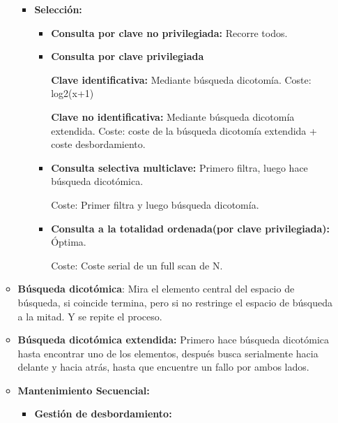 \documentclass[12pt, twoside, openright]{report} %
\begin{document}
\begin{itemize}
\begin{itemize}
\begin{itemize}
      \item \textbf{Selección:}
        

        \begin{itemize}
        \item \textbf{Consulta por clave no privilegiada:} Recorre todos.
          
        \item \textbf{Consulta por clave privilegiada}
          

          
            \textbf{Clave identificativa:} Mediante búsqueda dicotomía. Coste: log2(x+1)
              
			  
         
			
            \textbf{Clave no identificativa:} Mediante búsqueda
            dicotomía extendida. Coste: coste de la búsqueda dicotomía extendida + coste
              desbordamiento.
             
        \item \textbf{Consulta selectiva multiclave:} Primero filtra, luego
          hace búsqueda dicotómica.
          

          
		  
            Coste: Primer filtra y luego búsqueda dicotomía.
            
			
        \item \textbf{Consulta a la totalidad ordenada(por clave
          privilegiada):} Óptima.
          

        
            Coste: Coste serial de un full scan de N.
           
        \end{itemize}
      \end{itemize}
    \item \textbf{Búsqueda dicotómica}: Mira el elemento central del espacio
      de búsqueda, si coincide termina, pero si no restringe el espacio
      de búsqueda a la mitad. Y se repite el proceso.
      
    \item \textbf{Búsqueda dicotómica extendida:} Primero hace búsqueda
      dicotómica hasta encontrar uno de los elementos, después busca
      serialmente hacia delante y hacia atrás, hasta que encuentre un
      fallo por ambos lados.
      
    \item \textbf{Mantenimiento Secuencial:}
      

      \begin{itemize}
      \item \textbf{Gestión de desbordamiento:}
        


\end{itemize}
\end{itemize}
\end{itemize}
\end{document}

